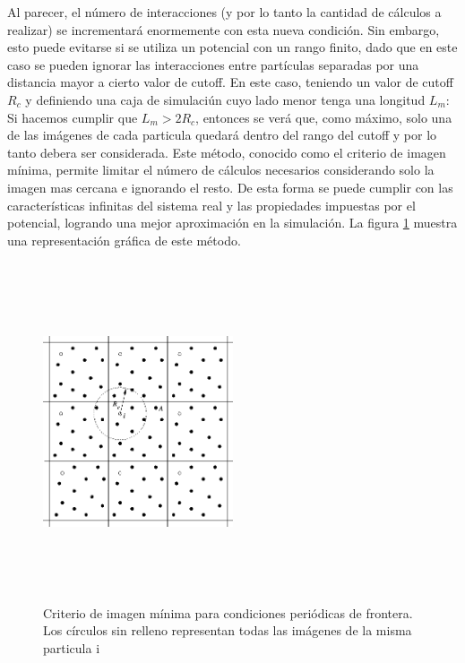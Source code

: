 Al parecer, el número de interacciones (y por lo tanto la cantidad de cálculos a realizar) se incrementará enormemente con esta nueva condición. 
Sin embargo, esto puede evitarse si se utiliza un potencial con un rango finito, dado que en este caso se pueden ignorar las interacciones entre partículas separadas por una distancia mayor a cierto valor de cutoff.
En este caso, teniendo un valor de cutoff $R_{c}$ y definiendo una caja de simulaciún cuyo lado menor tenga una longitud $L_m$: 
Si hacemos cumplir que $L_m>2R_{c}$, entonces se verá que, como máximo, solo una de las imágenes de cada particula quedará dentro del rango del cutoff y por lo tanto debera ser considerada.
Este método, conocido como el criterio de imagen mínima, permite limitar el número de cálculos necesarios considerando solo la imagen mas cercana e ignorando el resto. 
De esta forma se puede cumplir con las características infinitas del sistema real y las propiedades impuestas por el potencial, logrando una mejor aproximación en la simulación.
La figura \ref{minimage} muestra una representación gráfica de este método. 


\begin{figure}[!ht]
\centering
\includegraphics[keepaspectratio, height=10cm ,width=0.5\textwidth]{img/minimage.png}
\caption{Criterio de imagen mínima para condiciones periódicas de frontera. Los círculos sin relleno representan todas las imágenes de la misma particula i}
\label{minimage}
\end{figure}












